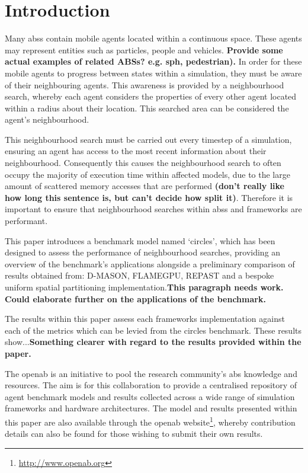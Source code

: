 
\section{Introduction}
  Many \glspl{abs} contain mobile agents located within a continuous space. These agents may represent entities such as particles, people and vehicles. \textbf{Provide some actual examples of related ABSs? e.g. sph, pedestrian).} In order for these mobile agents to progress between states within a simulation, they must be aware of their neighbouring agents. This awareness is provided by a neighbourhood search, whereby each agent considers the properties of every other agent located within a radius about their location. This searched area can be considered the agent's neighbourhood.
  
  This neighbourhood search must be carried out every timestep of a simulation, ensuring an agent has access to the most recent information about their neighbourhood. Consequently this causes the neighbourhood search to often occupy the majority of execution time within affected models, due to the large amount of scattered memory accesses that are performed \textbf{ (don't really like how long this sentence is, but can't decide how split it)}. Therefore it is important to ensure that neighbourhood searches within \glspl{abs} and frameworks are performant.
  
  This paper introduces a benchmark model named `circles', which has been designed to assess the performance of neighbourhood searches, providing an overview of the benchmark's applications alongside a preliminary comparison of results obtained from: D-MASON, FLAMEGPU, REPAST and a bespoke uniform spatial partitioning implementation.\textbf{This paragraph needs work. }\textbf{Could elaborate further on the applications of the benchmark.}
  
  The results within this paper assess each frameworks implementation against each of the metrics which can be levied from the circles benchmark. These results show...\textbf{Something clearer with regard to the results provided within the paper.}
  
  The \gls{openab} is an initiative to pool the research community's \gls{abs} knowledge and resources. The aim is for this collaboration to provide a centralised repository of agent benchmark models and results collected across a wide range of simulation frameworks and hardware architectures. The model and results presented within this paper are also available through the \gls{openab} website\footnote{\url{http://www.openab.org}}, whereby contribution details can also be found for those wishing to submit their own results.
  
